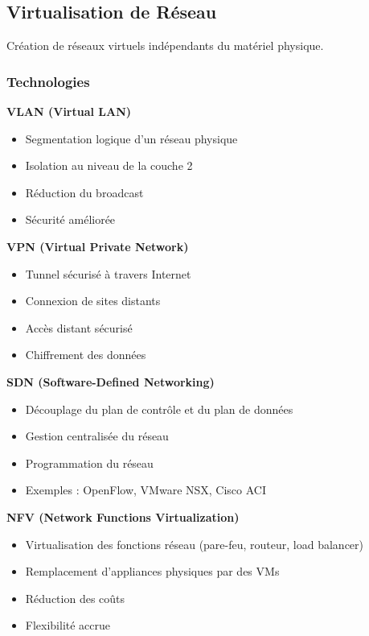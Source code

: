 \documentclass[11pt,a4paper]{article}
\begin{document}
\subsection{Virtualisation de Réseau}

Création de réseaux virtuels indépendants du matériel physique.

\subsubsection{Technologies}

\textbf{VLAN (Virtual LAN)}
\begin{itemize}
    \item Segmentation logique d'un réseau physique
    \item Isolation au niveau de la couche 2
    \item Réduction du broadcast
    \item Sécurité améliorée
\end{itemize}

\textbf{VPN (Virtual Private Network)}
\begin{itemize}
    \item Tunnel sécurisé à travers Internet
    \item Connexion de sites distants
    \item Accès distant sécurisé
    \item Chiffrement des données
\end{itemize}

\textbf{SDN (Software-Defined Networking)}
\begin{itemize}
    \item Découplage du plan de contrôle et du plan de données
    \item Gestion centralisée du réseau
    \item Programmation du réseau
    \item Exemples : OpenFlow, VMware NSX, Cisco ACI
\end{itemize}

\textbf{NFV (Network Functions Virtualization)}
\begin{itemize}
    \item Virtualisation des fonctions réseau (pare-feu, routeur, load balancer)
    \item Remplacement d'appliances physiques par des VMs
    \item Réduction des coûts
    \item Flexibilité accrue
\end{itemize}
\end{document}
